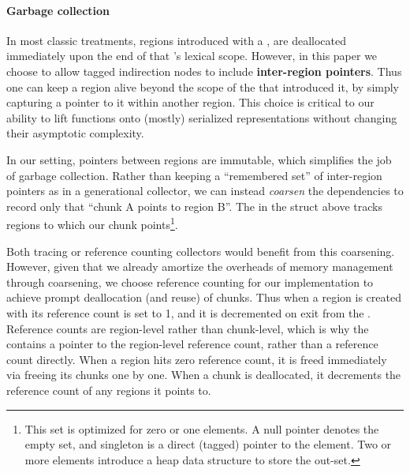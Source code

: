 \paragraph{Garbage collection}

In most classic treatments, regions introduced with a ,
are deallocated immediately upon the end of that 's lexical
scope.
%
However, in this paper we choose to allow tagged indirection nodes to include
{\bf inter-region pointers}.  Thus one can keep a region alive beyond the scope of the
 that introduced it, by simply capturing a pointer to it within
another region.
%
This choice is critical to our ability to lift functions onto (mostly)
serialized representations without changing their asymptotic complexity.

In our setting, pointers between regions are immutable, which simplifies the job of
garbage collection.  Rather than keeping a ``remembered set'' of inter-region pointers as
in a generational collector, we can instead \emph{coarsen} the dependencies to record only
that ``chunk A points to region B''.  The  in the  struct above
tracks regions to which our chunk points\footnote{This set is optimized for zero or one
  elements.  A null pointer denotes the empty set, and singleton is a direct (tagged)
  pointer to the element.  Two or more elements introduce a heap data structure to store
  the out-set.}.

Both tracing or reference counting collectors would benefit from this
coarsening.  However, given that we already amortize the overheads of memory
management through coarsening, we choose reference counting for our
implementation to achieve prompt deallocation (and reuse) of chunks.
%
Thus when a region is created with  its reference count is set to 1,
and it is decremented on exit from the .
%
Reference counts are region-level rather than chunk-level, which is why the
 contains a pointer to the region-level reference count, rather than
a reference count directly.
%
When a region hits zero reference count, it is freed immediately via freeing its
chunks one by one.  When a chunk is deallocated, it decrements the reference
count of any regions it points to.


